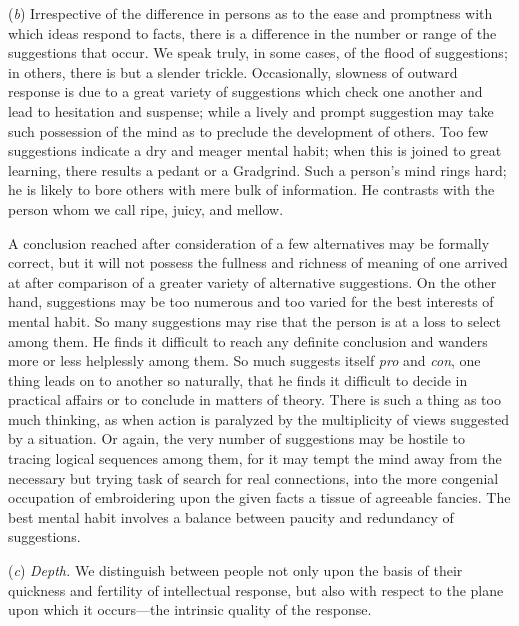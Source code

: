 \documentclass[letterpaper]{book}
\begin{document}

(\emph{b}) Irrespective of the difference in persons as to the ease and
promptness with which ideas respond to facts, there is a difference in
the number or range of the suggestions that occur. We speak truly, in
some cases, of the flood of suggestions; in others, there is but a
slender trickle. Occasionally, slowness of
outward
response is due to a great variety of suggestions which check one
another and lead to hesitation and suspense; while a lively and prompt
suggestion may take such possession of the mind as to preclude the
development of others. Too few suggestions indicate a dry and meager
mental habit; when this is joined to great learning, there results a
pedant or a Gradgrind. Such a person's mind rings hard; he is likely to
bore others with mere bulk of information. He contrasts with the person
whom we call ripe, juicy, and mellow.

A conclusion reached after consideration of a few alternatives may be
formally correct, but it will not possess the fullness and richness of
meaning of one arrived at after comparison of a greater variety of
alternative suggestions. On the other hand, suggestions may be too
numerous and too varied for the best interests of mental habit. So many
suggestions may rise that the person is at a loss to select among them.
He finds it difficult to reach any definite conclusion and wanders more
or less helplessly among them. So much suggests itself \emph{pro} and
\emph{con}, one thing leads on to another so naturally, that he finds it
difficult to decide in practical affairs or to conclude in matters of
theory. There is such a thing as too much thinking, as when action is
paralyzed by the multiplicity of views suggested by a situation. Or
again, the very number of suggestions may be hostile to tracing logical
sequences among them, for it may tempt the mind away from the necessary
but trying task of search for real connections, into the more congenial
occupation of embroidering upon the given facts a tissue of agreeable
fancies. The best mental habit involves a balance between paucity and
redundancy of
suggestions.


(\emph{c}) \emph{Depth.} We distinguish between people not only upon the
basis of their quickness and fertility of intellectual response, but
also with respect to the plane upon which it occurs---the intrinsic
quality of the response.
\end{document}
